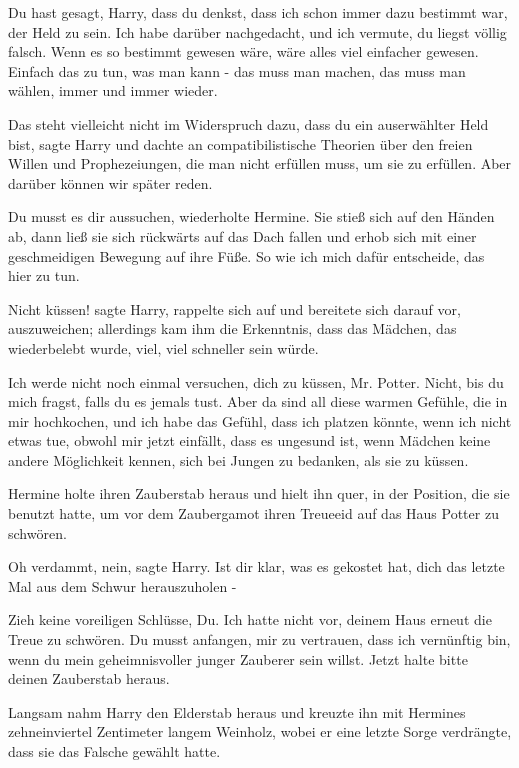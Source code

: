\glqq{}Du hast gesagt, Harry, dass du denkst, dass ich schon immer dazu bestimmt
war, der Held zu sein. Ich habe darüber nachgedacht, und ich vermute, du liegst
völlig falsch. Wenn es so bestimmt gewesen wäre, wäre alles viel einfacher
gewesen. Einfach das zu tun, was man kann - das muss man machen, das muss man
wählen, immer und immer wieder.\grqq{}

\glqq{}Das steht vielleicht nicht im Widerspruch dazu, dass du ein auserwählter
Held bist\grqq{}, sagte Harry und dachte an compatibilistische Theorien über den
freien Willen und Prophezeiungen, die man nicht erfüllen muss, um sie zu
erfüllen. \glqq{}Aber darüber können wir später reden.\grqq{}

\glqq{}Du musst es dir aussuchen\grqq{}, wiederholte Hermine. Sie stieß sich auf
den Händen ab, dann ließ sie sich rückwärts auf das Dach fallen und erhob sich
mit einer geschmeidigen Bewegung auf ihre Füße. \glqq{}So wie ich mich dafür
entscheide, das hier zu tun.\grqq{}

\glqq{}Nicht küssen!\grqq{} sagte Harry, rappelte sich auf und bereitete sich
darauf vor, auszuweichen; allerdings kam ihm die Erkenntnis, dass das Mädchen,
das wiederbelebt wurde, viel, viel schneller sein würde.

\glqq{}Ich werde nicht noch einmal versuchen, dich zu küssen, Mr. Potter. Nicht,
bis du mich fragst, falls du es jemals tust. Aber da sind all diese warmen
Gefühle, die in mir hochkochen, und ich habe das Gefühl, dass ich platzen
könnte, wenn ich nicht etwas tue, obwohl mir jetzt einfällt, dass es ungesund
ist, wenn Mädchen keine andere Möglichkeit kennen, sich bei Jungen zu bedanken,
als sie zu küssen.\grqq{}

Hermine holte ihren Zauberstab heraus und hielt ihn quer, in der Position, die
sie benutzt hatte, um vor dem Zaubergamot ihren Treueeid auf das Haus Potter zu
schwören.

\glqq{}Oh verdammt, nein\grqq{}, sagte Harry. \glqq{}Ist dir klar, was es gekostet
hat, dich das letzte Mal aus dem Schwur herauszuholen -\grqq{}

\glqq{}Zieh keine voreiligen Schlüsse, Du. Ich hatte nicht vor, deinem Haus
erneut die Treue zu schwören. Du musst anfangen, mir zu vertrauen, dass ich
vernünftig bin, wenn du mein geheimnisvoller junger Zauberer sein willst. Jetzt
halte bitte deinen Zauberstab heraus.\grqq{}

Langsam nahm Harry den Elderstab heraus und kreuzte ihn mit Hermines
zehneinviertel Zentimeter langem Weinholz, wobei er eine letzte Sorge
verdrängte, dass sie das Falsche gewählt hatte.

